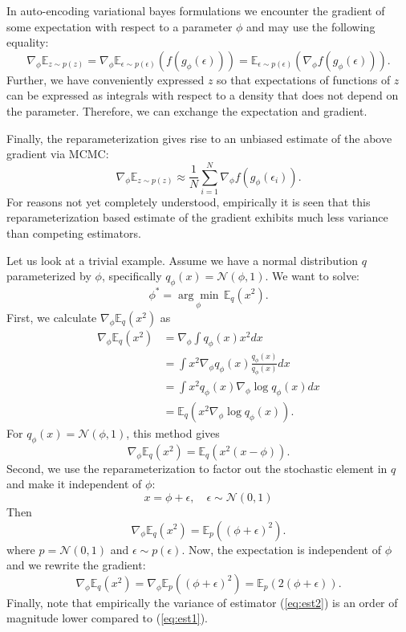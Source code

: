 \documentclass[11pt]{article}
\def\N{\mathcal{N}}
\def\E{\mathbb{E}}
\def\eps{\epsilon}
\begin{document}
In auto-encoding variational bayes formulations we encounter the gradient of some expectation with respect to a parameter $\phi$ and may use the following equality:
\begin{equation}
\nabla_\phi\E_{z\sim p(z)} = \nabla_\phi\E_{\eps\sim p(\eps)}(f(g_\phi(\eps))) = \E_{\eps\sim p(\eps)}(\nabla_\phi f(g_\phi(\eps))).
\end{equation}
Further, we have conveniently expressed $z$ so that expectations of functions of $z$ can be expressed as integrals with respect to a density that does not depend on the parameter. Therefore, we can exchange the expectation and gradient.

Finally, the reparameterization gives rise to an unbiased estimate of the above gradient via MCMC:
\begin{equation}
\nabla_\phi\E_{z\sim p(z)} \approx \frac{1}{N} \sum_{i=1}^N \nabla_\phi f(g_\phi(\eps_i)).
\end{equation}
For reasons not yet completely understood, empirically it is seen that this reparameterization based estimate of the gradient exhibits much less variance than competing estimators.

Let us look at a trivial example. Assume we have a normal distribution $q$ parameterized by $\phi$, specifically $q_\phi(x) = \N(\phi,1)$. We want to solve:
\begin{equation}
\phi^* = \underset{\phi}{\arg\min} \, \E_q(x^2).
\end{equation}
First, we calculate $\nabla_\phi\E_q(x^2)$ as
\begin{align}
\nabla_\phi\E_q(x^2)
&= \nabla_\phi \int q_\phi(x)x^2dx\\
&= \int x^2 \nabla_\phi q_\phi(x)\frac{q_\phi(x)}{q_\phi(x)}dx\\
&= \int x^2 q_\phi(x)\nabla_\phi\log q_\phi(x)dx\\
&= \E_q(x^2 \nabla_\phi \log q_\phi(x)).
\end{align}
For $q_\phi(x) = \N(\phi,1)$, this method gives
\begin{equation}
\nabla_\phi\E_q(x^2) = \E_q(x^2(x-\phi)).
\label{eq:est1}
\end{equation}
Second, we use the reparameterization to factor out the stochastic element in $q$ and make it independent of $\phi$:
\begin{equation}
x=\phi + \eps,\quad \eps\sim\N(0,1)
\end{equation}
Then
\begin{equation}
\nabla_\phi\E_q(x^2) = \E_p((\phi+\eps)^2).
\end{equation}
where $p=\N(0,1)$ and $\eps\sim p(\eps)$. Now, the expectation is independent of $\phi$ and we rewrite the gradient:
\begin{equation}
\nabla_\phi\E_q(x^2) = \nabla_\phi \E_p((\phi+\eps)^2) = \E_p(2(\phi+\eps)).
\label{eq:est2}
\end{equation}
Finally, note that empirically the variance of estimator (\ref{eq:est2}) is an order of magnitude lower compared to (\ref{eq:est1}).
\end{document}
